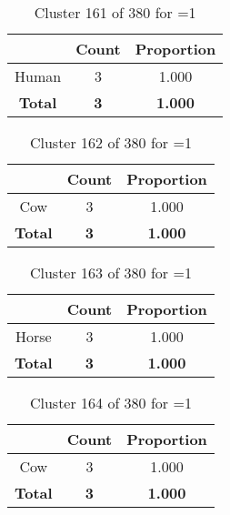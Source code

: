 \begin{table}[ht!]
\centering
\begin{tabular}{|c|c|c|}
\hline
\bf \Spec{} &\bf Count &\bf Proportion\\ \hline \hline
Human & 3 & 1.000\\ \hline
\hline
\bf Total & \bf 3 & \bf 1.000\\ \hline
\end{tabular}
\label{tab:cluster:161:1}
\caption{Cluster 161 of 380 for \minneigh{}=1}
\end{table}

\begin{table}[ht!]
\centering
\begin{tabular}{|c|c|c|}
\hline
\bf \Spec{} &\bf Count &\bf Proportion\\ \hline \hline
Cow & 3 & 1.000\\ \hline
\hline
\bf Total & \bf 3 & \bf 1.000\\ \hline
\end{tabular}
\label{tab:cluster:162:1}
\caption{Cluster 162 of 380 for \minneigh{}=1}
\end{table}

\begin{table}[ht!]
\centering
\begin{tabular}{|c|c|c|}
\hline
\bf \Spec{} &\bf Count &\bf Proportion\\ \hline \hline
Horse & 3 & 1.000\\ \hline
\hline
\bf Total & \bf 3 & \bf 1.000\\ \hline
\end{tabular}
\label{tab:cluster:163:1}
\caption{Cluster 163 of 380 for \minneigh{}=1}
\end{table}

\begin{table}[ht!]
\centering
\begin{tabular}{|c|c|c|}
\hline
\bf \Spec{} &\bf Count &\bf Proportion\\ \hline \hline
Cow & 3 & 1.000\\ \hline
\hline
\bf Total & \bf 3 & \bf 1.000\\ \hline
\end{tabular}
\label{tab:cluster:164:1}
\caption{Cluster 164 of 380 for \minneigh{}=1}
\end{table}

